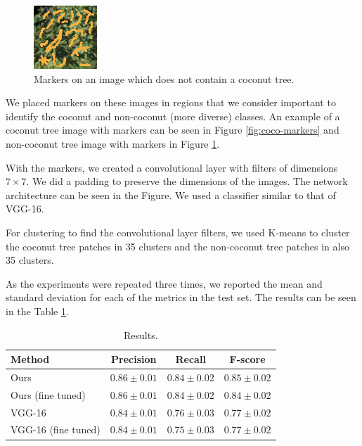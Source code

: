 \documentclass[a4paper,conference]{IEEEtran}
\begin{document}
  \begin{figure}[t]
    \begin{center}
       \includegraphics[width=0.4\linewidth]{figures/non_coco-markers.png}
    \end{center}
       \caption{Markers on an image which does not contain a coconut tree.}
    \label{fig:non-coco-markers}
  \end{figure}

We placed markers on these images in regions that we consider important to identify the coconut and non-coconut (more diverse) classes. An example of a coconut tree image with markers can be seen in Figure \ref{fig:coco-markers} and non-coconut tree image with markers in Figure \ref{fig:non-coco-markers}.

With the markers, we created a convolutional layer with filters of dimensions $7 \times 7$. We did a padding to preserve the dimensions of the images. The network architecture can be seen in the Figure. We used a classifier similar to that of VGG-16.

For clustering to find the convolutional layer filters, we used K-means to cluster the coconut tree patches in 35 clusters and the non-coconut tree patches in also 35 clusters.

As the experiments were repeated three times, we reported the mean and standard deviation for each of the metrics in the test set. The results can be seen in the Table \ref{tab:results}.

\begin{table}[!t]
  \begin{center}
  \begin{tabular}{|l|c|c|c|}
  \hline
   Method & Precision & Recall & F-score \\
  \hline\hline
  Ours & $0.86 \pm 0.01$ & $0.84 \pm 0.02$ & $0.85 \pm 0.02$\\
  Ours (fine tuned) & $0.86 \pm 0.01$ & $0.84 \pm 0.02$ & $0.84 \pm 0.02$\\
  VGG-16 & $0.84 \pm 0.01$ & $0.76 \pm 0.03$ & $0.77 \pm 0.02 $ \\
  VGG-16 (fine tuned) & $0.84 \pm 0.01$ & $0.75 \pm 0.03$ & $0.77 \pm 0.02 $ \\
  \hline
  \end{tabular}
  \end{center}
  \caption{Results.}
  \label{tab:results}
\end{table}



\end{document}
